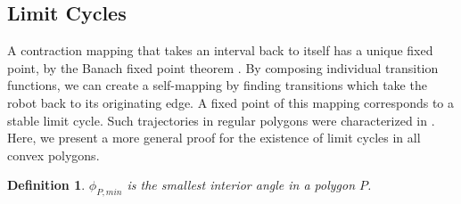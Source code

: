 \documentclass[sageh,times,Review]{sagej}
\newtheorem{definition}{Definition}
\begin{document}
\subsection{Limit Cycles} \label{sec:limcycles}
A contraction mapping that takes an interval back
to itself has a unique fixed point, by the Banach fixed point
theorem \cite{Granas2003}. By composing individual transition functions, 
we can create a self-mapping 
by finding transitions which take the robot back to its originating edge. A fixed
point of this mapping corresponds to a stable limit cycle.
Such trajectories in regular polygons were characterized in \cite{NilBecLav17}.
Here, we present a more general proof for the existence of limit cycles in all
convex polygons.

\begin{definition}
$\phi_{P,min}$ is the smallest interior angle in a polygon $P$.
\end{definition}
\end{document}
